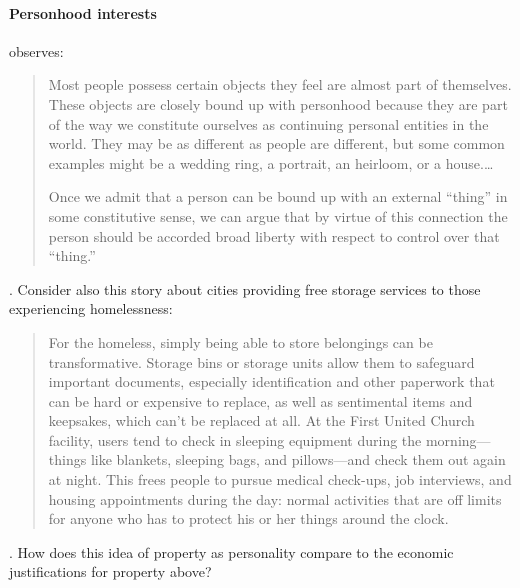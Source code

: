 \paragraph{Personhood interests}
 observes:
\begin{quotation}
Most people possess certain objects they feel are almost part of themselves.
These objects are closely bound up with personhood because they are part of the
way we constitute ourselves as continuing personal entities in the world. They
may be as different as people are different, but some common examples might be a
wedding ring, a portrait, an heirloom, or a house.\ldots

Once we admit that a person can be bound up with an external
``thing'' in some constitutive sense, we can argue that by virtue of this
connection the person should be accorded broad liberty with respect
to control over that ``thing.''
\end{quotation}
. Consider also this story about
cities providing free storage services to those experiencing homelessness:
\begin{quote}
For the homeless, simply being able to store belongings can be transformative.
Storage bins or storage units allow them to safeguard important documents,
especially identification and other paperwork that can be hard or expensive to
replace, as well as sentimental items and keepsakes, which can't be replaced at
all. At the First United Church facility, users tend to check in sleeping
equipment during the morning---things like blankets, sleeping bags, and     
pillows---and check them out again at night. This frees people to pursue    
medical check-ups, job interviews, and housing appointments during the day: 
normal activities that are off limits for anyone who has to protect his or her
things around the clock.                                      
\end{quote}
. How does this idea of property as
personality compare to the economic justifications for property above?


